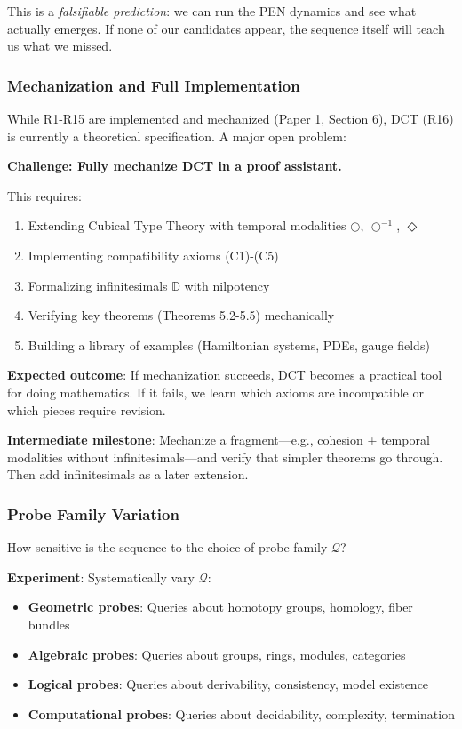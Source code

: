 \documentclass[11pt]{article}
\theoremstyle{definition}
\begin{document}
This is a \emph{falsifiable prediction}: we can run the PEN dynamics and see what actually emerges. If none of our candidates appear, the sequence itself will teach us what we missed.

\subsubsection{Mechanization and Full Implementation}

While R1-R15 are implemented and mechanized (Paper 1, Section 6), DCT (R16) is currently a theoretical specification. A major open problem:

\textbf{Challenge: Fully mechanize DCT in a proof assistant.}

This requires:
\begin{enumerate}
\item Extending Cubical Type Theory with temporal modalities $\bigcirc$, $\bigcirc^{-1}$, $\Diamond$
\item Implementing compatibility axioms (C1)-(C5)
\item Formalizing infinitesimals $\mathbb{D}$ with nilpotency
\item Verifying key theorems (Theorems 5.2-5.5) mechanically
\item Building a library of examples (Hamiltonian systems, PDEs, gauge fields)
\end{enumerate}

\textbf{Expected outcome}: If mechanization succeeds, DCT becomes a practical tool for doing mathematics. If it fails, we learn which axioms are incompatible or which pieces require revision.

\textbf{Intermediate milestone}: Mechanize a fragment—e.g., cohesion + temporal modalities without infinitesimals—and verify that simpler theorems go through. Then add infinitesimals as a later extension.

\subsubsection{Probe Family Variation}

How sensitive is the sequence to the choice of probe family $\mathcal{Q}$? 

\textbf{Experiment}: Systematically vary $\mathcal{Q}$:
\begin{itemize}
\item \textbf{Geometric probes}: Queries about homotopy groups, homology, fiber bundles
\item \textbf{Algebraic probes}: Queries about groups, rings, modules, categories
\item \textbf{Logical probes}: Queries about derivability, consistency, model existence
\item \textbf{Computational probes}: Queries about decidability, complexity, termination
\end{itemize}
\end{document}
